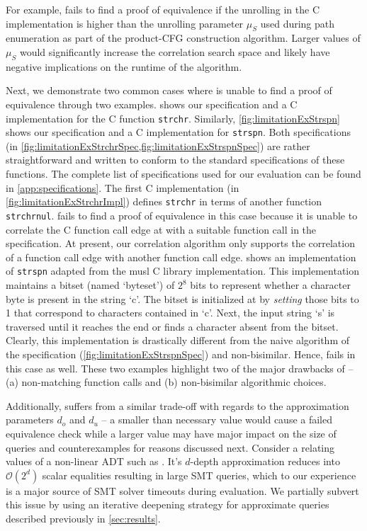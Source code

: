 For example, \toolName{} fails to find a proof of equivalence if the unrolling
in the C implementation is higher than the unrolling parameter $\mu_S$ used during path
enumeration as part of the product-CFG construction algorithm.
Larger values of $\mu_S$ would significantly increase the correlation search space and likely
have negative implications on the runtime of the algorithm.

Next, we demonstrate two common cases where \toolName{} is unable to find a proof of equivalence through two examples.
 shows our \SpecL{} specification and a C implementation for the C function {\tt strchr}.
Similarly, \cref{fig:limitationExStrspn} shows our \SpecL{} specification and a C implementation for {\tt strspn}.
Both specifications (in \cref{fig:limitationExStrchrSpec,fig:limitationExStrspnSpec}) are rather straightforward
and written to conform to the standard specifications of these functions.
The complete list of specifications used for our evaluation can be found in \cref{app:specifications}.
The first C implementation (in \cref{fig:limitationExStrchrImpl}) defines {\tt strchr} in terms of another function {\tt strchrnul}.
\toolName{} fails to find a proof of equivalence in this case because it is unable to correlate the C function call edge at  with
a suitable function call in the specification. At present, our correlation algorithm only supports the correlation of a function call edge
with another function call edge.
 shows an implementation of {\tt strspn} adapted from the musl C library implementation.
This implementation maintains a bitset (named `byteset') of $2^{8}$ bits to represent whether a character byte is present in the string `c'.
The bitset is initialized at  by {\em setting} those bits to 1 that correspond to characters contained in `c'.
Next, the input string `s' is traversed until it reaches the end or finds a character absent from the bitset.
Clearly, this implementation is drastically different from the naive algorithm of the specification (\cref{fig:limitationExStrspnSpec})
and non-bisimilar. Hence, \toolName{} fails in this case as well.
These two examples highlight two of the major drawbacks of \toolName{} -- (a) non-matching function calls and (b) non-bisimilar algorithmic choices.

Additionally, \toolName{} suffers from a similar trade-off with regards to the approximation parameters $d_o$ and $d_u$
-- a smaller than necessary value would cause a failed equivalence check while a larger value may
have major impact on the size of queries and counterexamples for reasons discussed next.
Consider a \recursiveRelation{} relating values of a non-linear ADT such as .
It's $d$-depth approximation reduces into $\mathcal{O}(2^d)$ scalar equalities resulting in large SMT queries,
which to our experience is a major source of SMT solver timeouts during evaluation.
We partially subvert this issue by using an iterative deepening strategy for approximate queries described previously in \cref{sec:results}.

